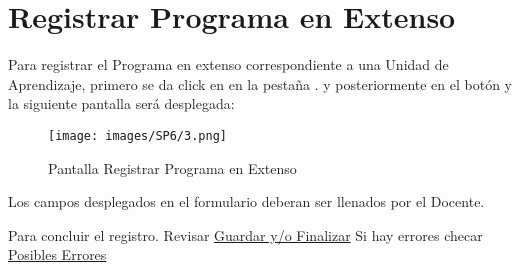\section{Registrar Programa en Extenso}

Para registrar el Programa en extenso correspondiente a una Unidad de Aprendizaje, primero se da click en en la pestaña . y posteriormente en el botón  y la siguiente pantalla será desplegada:

\begin{figure}[!h]
    \centering
    \hypertarget{9}{\texttt{[image: images/SP6/3.png]}}
    \caption{Pantalla Registrar Programa en Extenso}
\end{figure}

Los campos desplegados en el formulario deberan ser llenados por el Docente.

Para concluir el registro. Revisar \hyperlink{GuardarFinalizar}{Guardar y/o Finalizar}
Si hay errores checar \hyperlink{Errores}{Posibles Errores}